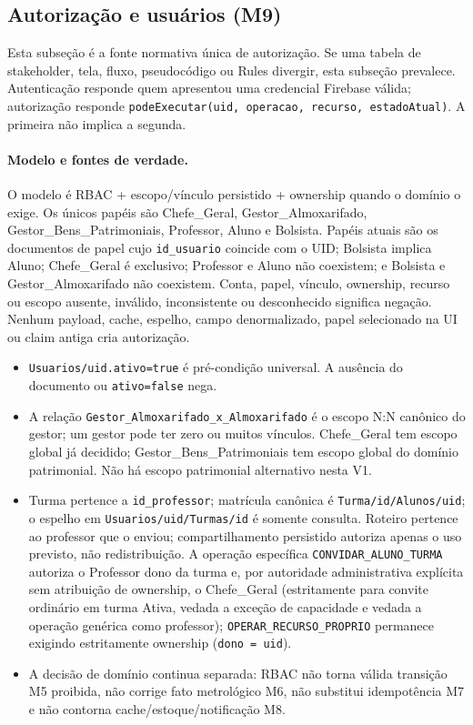 \subsection{Autorização e usuários (M9)}
\label{sec:m9-autorizacao}

Esta subseção é a fonte normativa única de autorização. Se uma tabela de
stakeholder, tela, fluxo, pseudocódigo ou Rules divergir, esta subseção
prevalece. Autenticação responde quem apresentou uma credencial Firebase
válida; autorização responde \texttt{podeExecutar(uid, operacao, recurso,
estadoAtual)}. A primeira não implica a segunda.

\paragraph{Modelo e fontes de verdade.}
O modelo é RBAC + escopo/vínculo persistido + ownership quando o domínio o
exige. Os únicos papéis são Chefe\_Geral, Gestor\_Almoxarifado,
Gestor\_Bens\_Patrimoniais, Professor, Aluno e Bolsista. Papéis atuais são
os documentos de papel cujo \texttt{id\_usuario} coincide com o UID; Bolsista
implica Aluno; Chefe\_Geral é exclusivo; Professor e Aluno não coexistem; e
Bolsista e Gestor\_Almoxarifado não coexistem. Conta, papel, vínculo,
ownership, recurso ou escopo ausente, inválido, inconsistente ou desconhecido
significa negação. Nenhum payload, cache, espelho, campo denormalizado, papel
selecionado na UI ou claim antiga cria autorização.

\begin{itemize}
  \item \texttt{Usuarios/uid.ativo=true} é pré-condição universal. A ausência
  do documento ou \texttt{ativo=false} nega.
  \item A relação \texttt{Gestor\_Almoxarifado\_x\_Almoxarifado} é o escopo
  N:N canônico do gestor; um gestor pode ter zero ou muitos vínculos.
  Chefe\_Geral tem escopo global já decidido; Gestor\_Bens\_Patrimoniais tem
  escopo global do domínio patrimonial. Não há escopo patrimonial alternativo
  nesta V1.
  \item Turma pertence a \texttt{id\_professor}; matrícula canônica é
  \texttt{Turma/id/Alunos/uid}; o espelho em
  \texttt{Usuarios/uid/Turmas/id} é somente consulta. Roteiro pertence ao
  professor que o enviou; compartilhamento persistido autoriza apenas o uso
  previsto, não redistribuição. A operação específica \texttt{CONVIDAR\_ALUNO\_TURMA}
  autoriza o Professor dono da turma e, por autoridade administrativa explícita sem
  atribuição de ownership, o Chefe\_Geral (estritamente para convite ordinário em
  turma Ativa, vedada a exceção de capacidade e vedada a operação genérica como
  professor); \texttt{OPERAR\_RECURSO\_PROPRIO} permanece exigindo estritamente
  ownership (\texttt{dono = uid}).
  \item A decisão de domínio continua separada: RBAC não torna válida
  transição M5 proibida, não corrige fato metrológico M6, não substitui
  idempotência M7 e não contorna cache/estoque/notificação M8.
\end{itemize}

